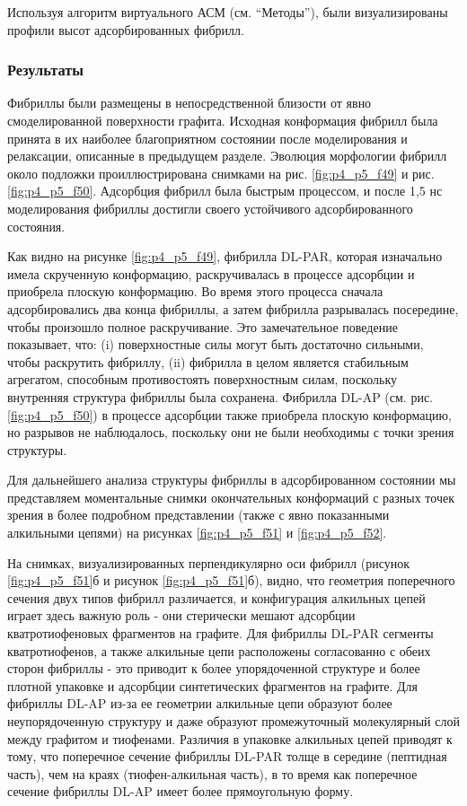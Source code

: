    Используя алгоритм виртуального АСМ (см. ``Методы''), были визуализированы профили высот адсорбированных фибрилл.

\subsubsection{Результаты}

    Фибриллы были размещены в непосредственной близости от явно смоделированной поверхности графита. Исходная конформация фибрилл была принята в их наиболее благоприятном состоянии после моделирования и релаксации, описанные в предыдущем разделе. Эволюция морфологии фибрилл около подложки проиллюстрирована снимками на рис. \ref{fig:p4_p5_f49} и рис. \ref{fig:p4_p5_f50}. Адсорбция фибрилл была быстрым процессом, и после 1,5 нс моделирования фибриллы достигли своего устойчивого адсорбированного состояния.

    Как видно на рисунке \ref{fig:p4_p5_f49}, фибрилла DL-PAR, которая изначально имела скрученную конформацию, раскручивалась в процессе адсорбции и приобрела плоскую конформацию. Во время этого процесса сначала адсорбировались два конца фибриллы, а затем фибрилла разрывалась посередине, чтобы произошло полное раскручивание. Это замечательное поведение показывает, что: (i) поверхностные силы могут быть достаточно сильными, чтобы раскрутить фибриллу, (ii) фибрилла в целом является стабильным агрегатом, способным противостоять поверхностным силам, поскольку внутренняя структура фибриллы была сохранена. Фибрилла DL-AP (см. рис. \ref{fig:p4_p5_f50}) в процессе адсорбции также приобрела плоскую конформацию, но разрывов не наблюдалось, поскольку они не были необходимы с точки зрения структуры.

    Для дальнейшего анализа структуры фибриллы в адсорбированном состоянии мы представляем моментальные снимки окончательных конформаций с разных точек зрения в более подробном представлении (также с явно показанными алкильными цепями) на рисунках \ref{fig:p4_p5_f51} и \ref{fig:p4_p5_f52}.

    На снимках, визуализированных перпендикулярно оси фибрилл (рисунок \ref{fig:p4_p5_f51}б и рисунок \ref{fig:p4_p5_f51}б), видно, что геометрия поперечного сечения двух типов фибрилл различается, и конфигурация алкильных цепей играет здесь важную роль - они стерически мешают адсорбции кватротиофеновых фрагментов на графите. Для фибриллы DL-PAR сегменты кватротиофенов, а также алкильные цепи расположены согласованно с обеих сторон фибриллы - это приводит к более упорядоченной структуре и более плотной упаковке и адсорбции синтетических фрагментов на графите. Для фибриллы DL-AP из-за ее геометрии алкильные цепи образуют более неупорядоченную структуру и даже образуют промежуточный молекулярный слой между графитом и тиофенами. Различия в упаковке алкильных цепей приводят к тому, что поперечное сечение фибриллы DL-PAR толще в середине (пептидная часть), чем на краях (тиофен-алкильная часть), в то время как поперечное сечение фибриллы DL-AP имеет более прямоугольную форму.

